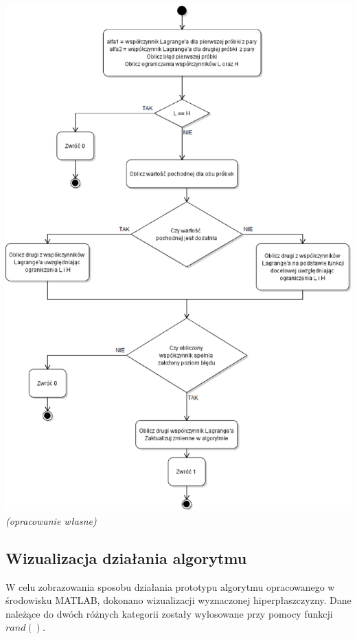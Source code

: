 \documentclass[[10pt,a4paper]{article}
\begin{document}
\begin{center}
\includegraphics[scale=0.6]{optimizePair}\\
\textit{(opracowanie własne)}
\end{center}

\subsection{Wizualizacja działania algorytmu}
W celu zobrazowania sposobu działania prototypu algorytmu opracowanego w środowisku MATLAB, dokonano wizualizacji wyznaczonej hiperpłaszczyzny. Dane należące do dwóch różnych kategorii zostały wylosowane przy pomocy funkcji $rand()$.
\end{document}
